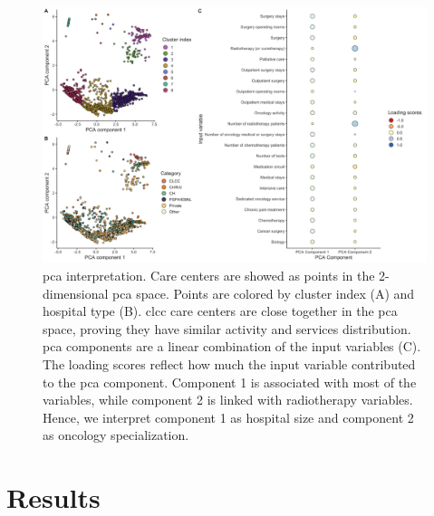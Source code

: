 \begin{figure}[h]
    \includegraphics[width=\textwidth]{images/camion/supplemental/sup_fig1_pca_and_clustering.png}
    \centering
    \caption{
        \ac{pca} interpretation. Care centers are showed as points in the 2-dimensional \ac{pca} space. Points are colored by cluster index (A) and hospital type (B). \ac{clcc} care centers are close together in the \acs{pca} space, proving they have similar activity and services distribution. \acs{pca} components are a linear combination of the input variables (C). The loading scores reflect how much the input variable contributed to the \acs{pca} component. Component 1 is associated with most of the variables, while component 2 is linked with radiotherapy variables. Hence, we interpret component 1 as hospital size and component 2 as oncology specialization.
    }
    \label{fig:clustering-pca}
\end{figure}

\section{Results}

